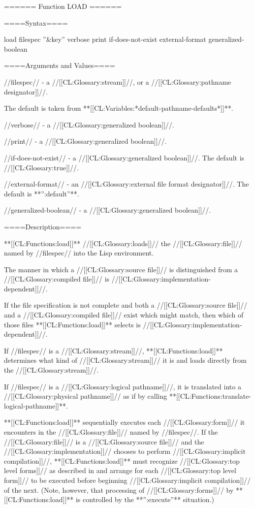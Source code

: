 ====== Function LOAD ======

====Syntax====

\DefunWithValuesNewline load {filespec ''&key'' verbose print if-does-not-exist external-format} {generalized-boolean}

====Arguments and Values====

//filespec// - a //[[CL:Glossary:stream]]//, or a //[[CL:Glossary:pathname designator]]//.

The default is taken from **[[CL:Variables:*default-pathname-defaults*]]**.

//verbose// - a //[[CL:Glossary:generalized boolean]]//. 

//print// - a //[[CL:Glossary:generalized boolean]]//. 

//if-does-not-exist// - a //[[CL:Glossary:generalized boolean]]//. The default is //[[CL:Glossary:true]]//.

//external-format// - an //[[CL:Glossary:external file format designator]]//. The default is **'':default''**.

//generalized-boolean// - a //[[CL:Glossary:generalized boolean]]//.

====Description====

**[[CL:Functions:load]]** //[[CL:Glossary:loads]]// the //[[CL:Glossary:file]]// named by //filespec// into the Lisp environment.

The manner in which a //[[CL:Glossary:source file]]// is distinguished from a //[[CL:Glossary:compiled file]]// is //[[CL:Glossary:implementation-dependent]]//.

If the file specification is not complete and both a //[[CL:Glossary:source file]]// and a //[[CL:Glossary:compiled file]]// exist which might match, then which of those files **[[CL:Functions:load]]** selects is //[[CL:Glossary:implementation-dependent]]//.

If //filespec// is a //[[CL:Glossary:stream]]//, **[[CL:Functions:load]]** determines what kind of //[[CL:Glossary:stream]]// it is and loads directly from the //[[CL:Glossary:stream]]//.

If //filespec// is a //[[CL:Glossary:logical pathname]]//, it is translated into a //[[CL:Glossary:physical pathname]]// as if by calling **[[CL:Functions:translate-logical-pathname]]**.

**[[CL:Functions:load]]** sequentially executes each //[[CL:Glossary:form]]// it encounters in the //[[CL:Glossary:file]]// named by //filespec//. If the //[[CL:Glossary:file]]// is a //[[CL:Glossary:source file]]// and the //[[CL:Glossary:implementation]]// chooses to perform //[[CL:Glossary:implicit compilation]]//, **[[CL:Functions:load]]** must recognize //[[CL:Glossary:top level forms]]// as described in {\secref\TopLevelForms} and arrange for each //[[CL:Glossary:top level form]]// to be executed before beginning //[[CL:Glossary:implicit compilation]]// of the next. (Note, however, that processing of  //[[CL:Glossary:forms]]// by **[[CL:Functions:load]]** is controlled by the **'':execute''** situation.)

